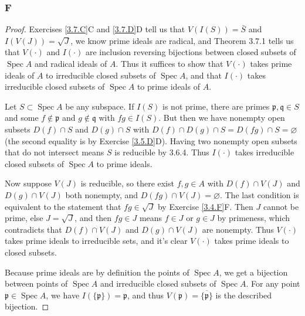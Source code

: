 \documentclass{article}
\newcommand{\frkp}{\mathfrak{p}}
\newcommand{\frkq}{\mathfrak{q}}
\DeclareMathOperator{\Spec}{\mathrm{Spec}}
\let\emptyset\varnothing
\begin{document}
\subsubsection{F}\label{3.7.F}
\begin{proof}
    Exercises \ref{3.7.C}C and \ref{3.7.D}D tell us that $V(I(S))=\bar S$ and $I(V(J))=\sqrt{J}$, we know prime ideals are radical, and Theorem 3.7.1 tells us that $V(\cdot)$ and $I(\cdot)$ are inclusion reversing bijections between closed subsets of $\Spec A$ and radical ideals of $A$. Thus it suffices to show that $V(\cdot)$ takes prime ideals of $A$ to irreducible closed subsets of $\Spec A$, and that $I(\cdot)$ takes irreducible closed subsets of $\Spec A$ to prime ideals of $A$.

    Let $S\subset \Spec A$ be any subspace. If $I(S)$ is not prime, there are primes $\frkp, \frkq \in S$ and some $f\notin \frkp$ and $g\notin \frkq$ with $fg\in I(S)$. But then we have nonempty open subsets $D(f)\cap S$ and $D(g)\cap S$ with $D(f)\cap D(g) \cap S=D(fg)\cap S=\emptyset$ (the second equality is by Exercise \ref{3.5.D}D). Having two nonempty open subsets that do not intersect means $S$ is reducible by 3.6.4. Thus $I(\cdot)$ takes irreducible closed subsets of $\Spec A$ to prime ideals.

    Now suppose $V(J)$ is reducible, so there exist $f,g\in A$ with $D(f)\cap V(J)$ and $D(g)\cap V(J)$ both nonempty, and $D(fg)\cap V(J)=\emptyset$. The last condition is equivalent to the statement that $fg\in \sqrt{J}$ by Exercise \ref{3.4.F}F. Then $J$ cannot be prime, else $J=\sqrt{J}$, and then $fg\in J$ means $f\in J$ or $g\in J$ by primeness, which contradicts that $D(f)\cap V(J)$ and $D(g)\cap V(J)$ are nonempty. Thus $V(\cdot)$ takes prime ideals to irreducible sets, and it's clear $V(\cdot)$ takes prime ideals to closed subsets.

    Because prime ideals are by definition the points of $\Spec A$, we get a bijection between points of $\Spec A$ and irreducible closed subsets of $\Spec A$. For any point $\frkp \in \Spec A$, we have $I(\{\frkp \})= \frkp$, and thus $V(\frkp)=\overline{\{\frkp\}}$ is the described bijection.

    
\end{proof}
\end{document}
